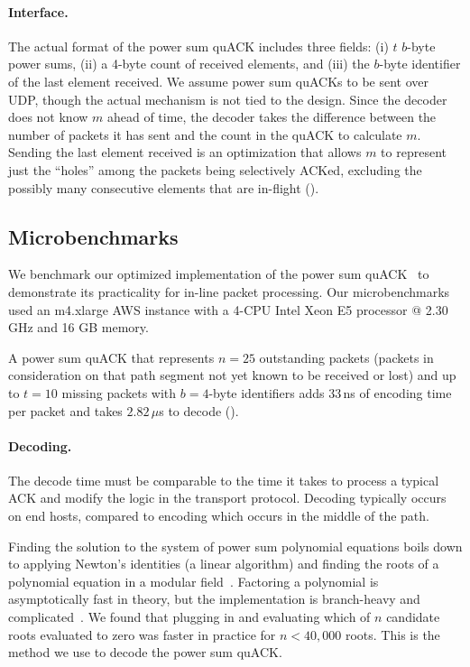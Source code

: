 \paragraph{Interface.}

% 

The actual format of the power sum quACK includes three fields: (i) $t$ $b$-byte
power sums, (ii) a 4-byte count of received elements, and (iii) the $b$-byte
identifier of the last element received. We assume power sum quACKs to be sent
over UDP, though the actual mechanism is not tied to the design.
Since the decoder
does not know $m$ ahead of time, the decoder takes the difference between the
number of packets it has sent and the count in the quACK to calculate $m$.
Sending the last element received is an optimization that allows $m$ to
represent just the ``holes'' among the packets being selectively ACKed,
excluding the possibly many consecutive elements that are in-flight
().

\subsection{Microbenchmarks}
\label{sec:quack:microbenchmarks}

We benchmark our optimized implementation of the power sum quACK~\cite{quack-github}
to demonstrate its practicality for in-line packet processing.
Our microbenchmarks used an m4.xlarge AWS instance with a 4-CPU Intel Xeon E5
processor @ 2.30 GHz and 16 GB memory.



A power sum quACK that represents $n=25$ outstanding packets
(packets in consideration on that path segment not yet known to be received or lost)
and up to $t=10$ missing
packets with $b=4$-byte identifiers adds $33$\,ns of encoding time per
packet and takes $2.82$\,$\mu$s to decode ().

\paragraph{Decoding.}
The decode time must be comparable to the time it takes to process a typical
ACK and modify the logic in the transport protocol. Decoding typically
occurs on end hosts, compared to encoding which occurs in the middle of the path.

Finding the solution to the system of power sum polynomial equations boils down
to applying Newton's identities (a linear algorithm) and finding the roots of a
polynomial equation
in a modular field~\cite{eppstein2011straggler}.
Factoring a polynomial is asymptotically fast in theory, but the implementation
is branch-heavy and complicated~\cite{batut2000user}.
We found that plugging in and evaluating which of $n$ candidate roots
evaluated to zero was faster in practice for $n < 40,000$ roots.
This is the method we use to decode the power sum quACK.


